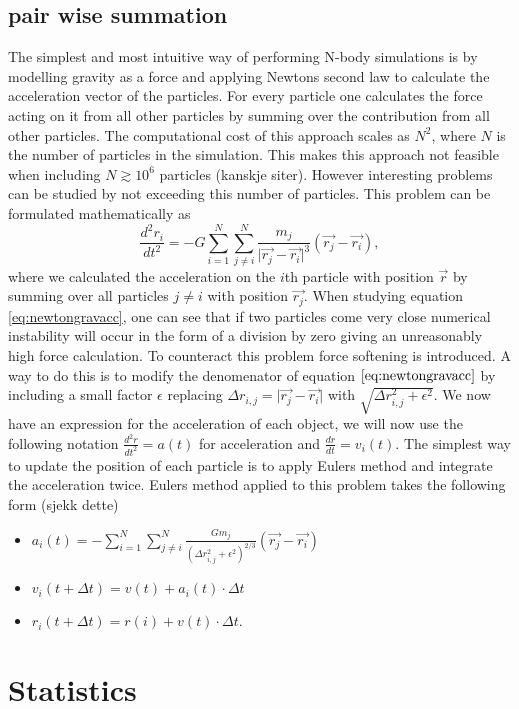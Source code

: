 \subsection{pair wise summation}
The simplest and most intuitive way of performing N-body simulations is by
modelling gravity as a force and applying Newtons second law to calculate the
acceleration vector of the particles. For every particle one calculates the
force acting on it from all other particles by summing over the contribution
from all other particles. The computational cost of this approach scales as
$N^2$, where $N$ is the number of particles in the simulation. This makes this
approach not feasible when including $N\gtrsim10^6$ particles (kanskje siter). However
interesting problems can be studied by not exceeding this number of particles. This problem can be formulated mathematically as
\begin{equation}\label{eq:newtongravacc}
    \frac{d^2r_i}{dt^2}=-G\sum_{i=1}^{N}\sum_{j\neq i}^N\frac{m_j}{\vert\vec{r_j}-\vec{r_i}\vert^3}(\vec{r_j}-\vec{r_i}),
\end{equation}
where we calculated the acceleration on the $i$th particle with position
$\vec{r}$ by summing over all particles $j\neq i$ with position $\vec{r_j}$.
When studying equation \ref{eq:newtongravacc}, one can see that if two particles
come very close numerical instability will occur in the form of a division by
zero giving an unreasonably high force calculation. To counteract this problem
force softening is introduced. A way to do this is to modify the denomenator of
equation $\ref{eq:newtongravacc}$ by including a small factor $\epsilon$
replacing $\Delta r_{i,j}=\vert\vec{r_j}-\vec{r_i}\vert$ with $\sqrt{\Delta
r_{i,j}^2+\epsilon^2}$. We now have an expression for the acceleration of each
object, we will now use the following notation $\frac{d^2r}{dt^2}=a(t)$ for
acceleration and $\frac{dr}{dt}=v_i(t)$. The simplest way to update the position
of each particle is to apply Eulers method and integrate the acceleration twice.
Eulers method applied to this problem takes the following form (sjekk dette)
\begin{itemize}
    \item $a_i(t)=-\sum_{i=1}^{N}\sum_{j\neq i}^N\frac{Gm_j}{(\Delta
    r_{i,j}^2+\epsilon^2)^{2/3}}(\vec{r_j}-\vec{r_i})$
    \item $v_i(t + \Delta t) = v(t) + a_i(t)\cdot\Delta t$
    \item $r_i(t + \Delta t) = r(i) + v(t)\cdot\Delta t.$
\end{itemize}






\section{Statistics}